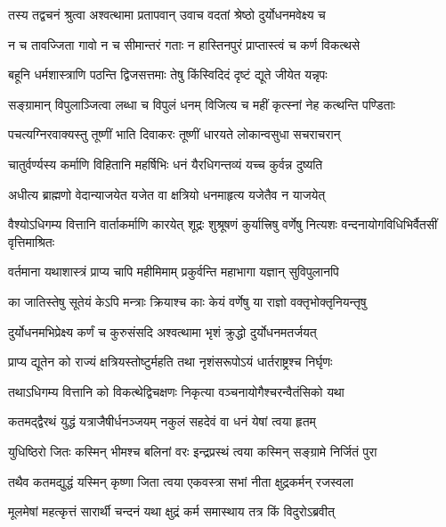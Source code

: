 \twolineshloka
{तस्य तद्वचनं श्रुत्वा अश्वत्थामा प्रतापवान्}
{उवाच वदतां श्रेष्ठो दुर्योधनमवेक्ष्य च}


\twolineshloka
{न च तावज्जिता गावो न च सीमान्तरं गताः}
{न हास्तिनपुरं प्राप्तास्त्वं च कर्ण विकत्थसे}


\twolineshloka
{बहूनि धर्मशास्त्राणि पठन्ति द्विजसत्तमाः}
{तेषु किंस्विदिदं दृष्टं द्यूते जीयेत यन्नृपः}


\twolineshloka
{सङ्ग्रामान् विपुलाञ्जित्वा लब्धा च विपुलं धनम्}
{विजित्य च महीं कृत्स्नां नेह कत्थन्ति पण्डिताः}


\twolineshloka
{पचत्यग्निरवाक्यस्तु तूष्णीं भाति दिवाकरः}
{तूष्णीं धारयते लोकान्वसुधा सचराचरान्}


\twolineshloka
{चातुर्वर्ण्यस्य कर्माणि विहितानि महर्षिभिः}
{धनं यैरधिगन्तव्यं यच्च कुर्वन्न दुष्यति}


\twolineshloka
{अधीत्य ब्राह्मणो वेदान्याजयेत यजेत वा}
{क्षत्रियो धनमाहृत्य यजेतैव न याजयेत्}


\onelineshloka
{वैश्योऽधिगम्य वित्तानि वार्ताकर्माणि कारयेत्}
\twolineshloka
{शूद्रः शुश्रूषणं कुर्यात्त्रिषु वर्णेषु नित्यशः}
{वन्दनायोगविधिभिर्वैतसीं वृत्तिमाश्रितः}


\twolineshloka
{वर्तमाना यथाशास्त्रं प्राप्य चापि महीमिमाम्}
{प्रकुर्वन्ति महाभागा यज्ञान् सुविपुलानपि}


\twolineshloka
{का जातिस्तेषु सूतेयं केऽपि मन्त्राः क्रियाश्च काः}
{केयं वर्णेषु या राज्ञो वक्तृभोक्तृनियन्तृषु}



\twolineshloka
{दुर्योधनमभिप्रेक्ष्य कर्णं च कुरुसंसदि}
{अश्वत्थामा भृशं क्रुद्धो दुर्योधनमतर्जयत्}


\twolineshloka
{प्राप्य द्यूतेन को राज्यं क्षत्रियस्तोष्टुर्महति}
{तथा नृशंसरूपोऽयं धार्तराष्ट्रश्च निर्घृणः}


\twolineshloka
{तथाऽधिगम्य वित्तानि को विकत्थेद्विचक्षणः}
{निकृत्या वञ्चनायोगैश्चरन्वैतंसिको यथा}


\twolineshloka
{कतमद्द्वैरथं युद्धं यत्राजैषीर्धनञ्जयम्}
{नकुलं सहदेवं वा धनं येषां त्वया हृतम्}


\twolineshloka
{युधिष्ठिरो जितः कस्मिन् भीमश्च बलिनां वरः}
{इन्द्रप्रस्थं त्वया कस्मिन् सङ्ग्रामे निर्जितं पुरा}


\twolineshloka
{तथैव कतमद्युद्धं यस्मिन् कृष्णा जिता त्वया}
{एकवस्त्रा सभां नीता क्षुद्रकर्मन् रजस्वला}


\twolineshloka
{मूलमेषां महत्कृत्तं सारार्थी चन्दनं यथा}
{क्षुद्रं कर्म समास्थाय तत्र किं विदुरोऽब्रवीत्}


